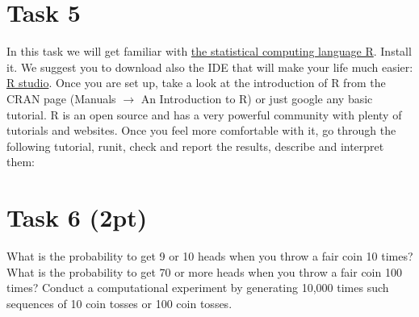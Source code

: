 \documentclass{article}
\begin{document}
\section*{Task 5}
In this task we will get familiar with \href{http://www.r-project.org/}{the statistical computing language R}. Install it. We suggest you to download also the IDE that will make your life much easier: \href{https://www.rstudio.com/}{R studio}. Once you are set up, take a look at the introduction of R from the CRAN page (Manuals $\rightarrow$ An Introduction to R) or just google any basic tutorial. R is an open source and has a very powerful community with plenty of tutorials and websites. Once you feel more comfortable with it, go through the following tutorial, runit, check and report the results, describe and interpret them:
\section*{Task 6 (2pt)}
What is the probability to get 9 or 10 heads when you throw a fair coin 10 times? What is the probability to get 70 or more heads when you throw a fair coin 100 times? Conduct a computational experiment by generating 10,000 times such sequences of 10 coin tosses or 100 coin tosses.
\end{document}

